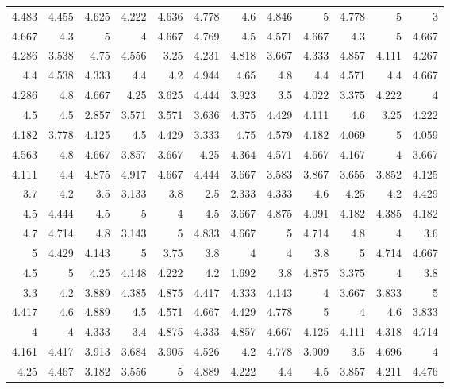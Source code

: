 \documentclass[10pt]{report}
\begin{document}
\begin{table}
\begin{tabular}{rrrrrrrrrrrr}
	4.483 & 4.455 & 4.625 & 4.222 & 4.636 & 4.778 & 4.6   & 4.846 & 5     & 4.778 & 5     & 3     \\
	4.667 & 4.3   & 5     & 4     & 4.667 & 4.769 & 4.5   & 4.571 & 4.667 & 4.3   & 5     & 4.667 \\
	4.286 & 3.538 & 4.75  & 4.556 & 3.25  & 4.231 & 4.818 & 3.667 & 4.333 & 4.857 & 4.111 & 4.267 \\
	4.4   & 4.538 & 4.333 & 4.4   & 4.2   & 4.944 & 4.65  & 4.8   & 4.4   & 4.571 & 4.4   & 4.667 \\
	4.286 & 4.8   & 4.667 & 4.25  & 3.625 & 4.444 & 3.923 & 3.5   & 4.022 & 3.375 & 4.222 & 4     \\
	4.5   & 4.5   & 2.857 & 3.571 & 3.571 & 3.636 & 4.375 & 4.429 & 4.111 & 4.6   & 3.25  & 4.222 \\
	4.182 & 3.778 & 4.125 & 4.5   & 4.429 & 3.333 & 4.75  & 4.579 & 4.182 & 4.069 & 5     & 4.059 \\
	4.563 & 4.8   & 4.667 & 3.857 & 3.667 & 4.25  & 4.364 & 4.571 & 4.667 & 4.167 & 4     & 3.667 \\
	4.111 & 4.4   & 4.875 & 4.917 & 4.667 & 4.444 & 3.667 & 3.583 & 3.867 & 3.655 & 3.852 & 4.125 \\
	3.7   & 4.2   & 3.5   & 3.133 & 3.8   & 2.5   & 2.333 & 4.333 & 4.6   & 4.25  & 4.2   & 4.429 \\
	4.5   & 4.444 & 4.5   & 5     & 4     & 4.5   & 3.667 & 4.875 & 4.091 & 4.182 & 4.385 & 4.182 \\
	4.7   & 4.714 & 4.8   & 3.143 & 5     & 4.833 & 4.667 & 5     & 4.714 & 4.8   & 4     & 3.6   \\
	5     & 4.429 & 4.143 & 5     & 3.75  & 3.8   & 4     & 4     & 3.8   & 5     & 4.714 & 4.667 \\
	4.5   & 5     & 4.25  & 4.148 & 4.222 & 4.2   & 1.692 & 3.8   & 4.875 & 3.375 & 4     & 3.8   \\
	3.3   & 4.2   & 3.889 & 4.385 & 4.875 & 4.417 & 4.333 & 4.143 & 4     & 3.667 & 3.833 & 5     \\
	4.417 & 4.6   & 4.889 & 4.5   & 4.571 & 4.667 & 4.429 & 4.778 & 5     & 4     & 4.6   & 3.833 \\
	4     & 4     & 4.333 & 3.4   & 4.875 & 4.333 & 4.857 & 4.667 & 4.125 & 4.111 & 4.318 & 4.714 \\
	4.161 & 4.417 & 3.913 & 3.684 & 3.905 & 4.526 & 4.2   & 4.778 & 3.909 & 3.5   & 4.696 & 4     \\
	4.25  & 4.467 & 3.182 & 3.556 & 5     & 4.889 & 4.222 & 4.4   & 4.5   & 3.857 & 4.211 & 4.476 \\

\end{tabular}
\end{table}
\end{document}
